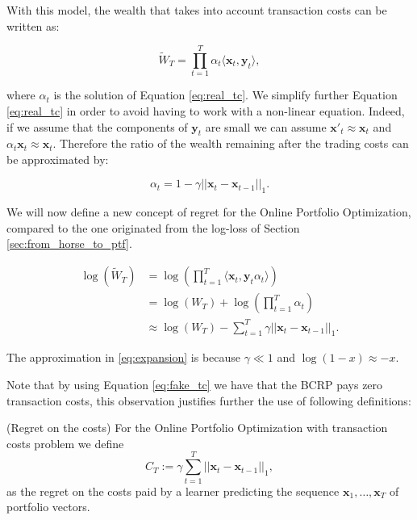 With this model, the wealth that takes into account transaction costs
can be written as:

\begin{equation} \label{eq:realwealth}
    \tilde W_T = \prod\limits_{t=1}^T \alpha_t\langle \mathbf{x}_t, \mathbf{y}_t \rangle,
\end{equation}

where $\alpha_t$ is the solution of Equation \eqref{eq:real_tc}. We simplify further Equation \eqref{eq:real_tc} in order to avoid having to work with a non-linear equation. Indeed, if we assume that the components of $\mathbf y_t$ are small we can assume $\mathbf x'_t\approx \mathbf x_t$ and $\alpha_t\mathbf x_t\approx\mathbf x_t$. Therefore the ratio of the wealth remaining after the trading costs can be approximated by:

\begin{equation}\label{eq:fake_tc}
\alpha_t=1-\gamma||\mathbf x_t-\mathbf x_{t-1}||_1.
\end{equation}

We will now define a new concept of regret for the Online Portfolio Optimization, compared to the one originated from the log-loss of Section \ref{sec:from_horse_to_ptf}. 

\begin{align}
    \log(\tilde W_T)&=\log\left(\prod\limits_{t=1}^T  \langle \mathbf{x}_t, \mathbf{y}_t \alpha_t\rangle\right) \\ 
    & = \log(W_T)+\log\left(\prod\limits_{t=1}^T \alpha_t\right) \\ 
    & \approx \log(W_T) - \sum\limits_{t=1}^T\gamma||\mathbf{x}_t-\mathbf{x}_{t-1}||_1. \label{eq:expansion}
\end{align}

The approximation in \eqref{eq:expansion} is because $\gamma\ll1$ and $\log(1-x)\approx-x$.


Note that by using Equation \eqref{eq:fake_tc} we have that the BCRP pays zero transaction costs, this observation justifies further the use of following definitions:

\begin{definition}(Regret on the costs)\label{def:regret_on_the_costs}
For the Online Portfolio Optimization with transaction costs problem we define 
\begin{equation}
C_T:=\gamma\sum\limits_{t=1}^T||\mathbf x_t-\mathbf x_{t-1}||_1,
\end{equation}
as the regret on the costs paid by a learner predicting the sequence $\mathbf x_1,\ldots,\mathbf x_T$ of portfolio vectors.
\end{definition}

